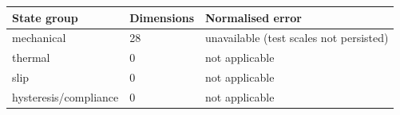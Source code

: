 \begin{tabular}{lll}
\toprule
State group & Dimensions & Normalised error \\ \midrule
mechanical & 28 & unavailable (test scales not persisted) \\
thermal & 0 & not applicable \\
slip & 0 & not applicable \\
hysteresis/compliance & 0 & not applicable \\
\bottomrule
\end{tabular}